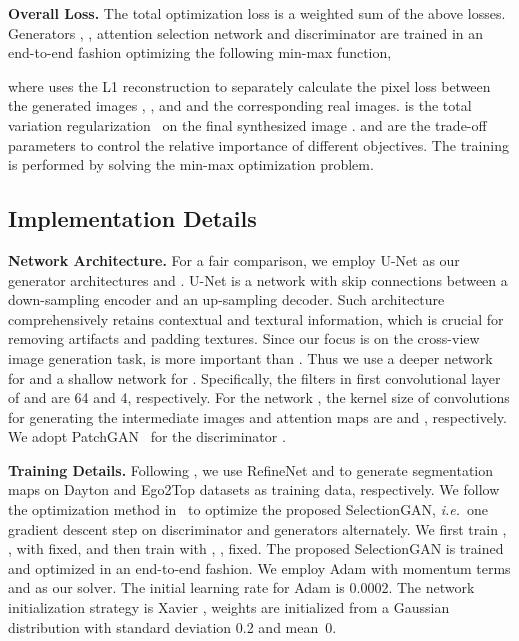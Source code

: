 \documentclass[10pt,twocolumn,letterpaper]{article}
\def\ie{\textit{i.e.}~}
\begin{document}
\noindent \textbf{Overall Loss.}
The total optimization loss is a weighted sum of the above losses.
Generators , , attention selection network  and discriminator  are trained in an end-to-end fashion optimizing the following min-max function,
\vspace{-0.1cm}
 
where  uses the L1 reconstruction to separately calculate the pixel loss between the generated images , ,  and  and the corresponding real images. 
 is the total variation regularization~\cite{johnson2016perceptual} on the final synthesized image .
 and  are the trade-off parameters to control the relative importance of different objectives. 
The training is performed by solving the min-max optimization problem.

\subsection{Implementation Details}
\vspace{-0.2cm}
\noindent \textbf{Network Architecture.}
For a fair comparison, we employ U-Net \cite{isola2017image} as our generator architectures  and .
U-Net is a network with skip connections between a down-sampling encoder and an up-sampling decoder. 
Such architecture comprehensively retains contextual and textural information, which is crucial for removing artifacts and padding textures. Since our focus is on the cross-view image generation task,  is more important than .
Thus we use a deeper network for  and a shallow network for .
Specifically, the filters in first convolutional layer of  and  are 64 and 4, respectively.
For the network , the kernel size of convolutions for generating the intermediate images and attention maps are  and , respectively.
We adopt PatchGAN~\cite{isola2017image} for the discriminator .

\noindent \textbf{Training Details.}
Following \cite{regmi2018cross}, we use RefineNet \cite{lin2017refinenet} and \cite{zhou2017scene} to generate segmentation maps on Dayton and Ego2Top datasets as training data, respectively.
We follow the optimization method in~\cite{goodfellow2014generative} to optimize the proposed SelectionGAN, \ie one gradient descent step on discriminator and generators alternately.
We first train , ,  with  fixed, and then train  with , ,   fixed.
The proposed SelectionGAN is trained and optimized in an end-to-end fashion.
We employ  Adam \cite{kingma2014adam} with momentum terms   and  as our solver.
The initial learning rate for Adam is 0.0002.
The network initialization strategy is Xavier \cite{glorot2010understanding}, weights are initialized from a Gaussian distribution with standard deviation 0.2 and mean~0.
\end{document}
